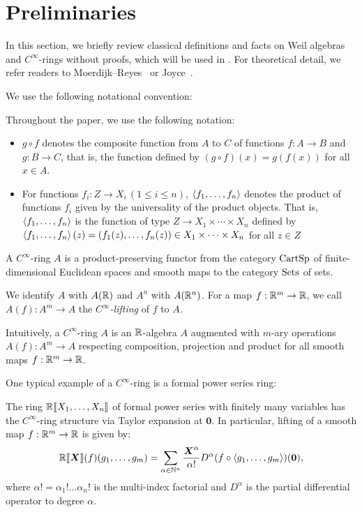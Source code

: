 \section{Preliminaries}\label{sec:prel}
In this section, we briefly review classical definitions and facts on Weil algebras and $C^\infty$-rings without proofs, which will be used in .
For theoretical detail, we refer readers to Moerdijk--Reyes~\cite[Chapters I and II]{Moerdijk:1991aa} or Joyce~\cite{joyce2016algebraic}.

We use the following notational convention:
\begin{definition}[Notation]
  Throughout the paper, we use the following notation:
  \begin{itemize}
    \item
    $g \circ f$ denotes the composite function from $A$ to $C$ of functions $f: A \to B$ and $g: B \to C$, that is, the function defined by $(g \circ f)(x) = g(f(x))$ for all $x \in A$.
    \item For functions $f_i: Z \to X_i\,(1 \leq i \leq n)$,
    $\braket{f_1, \dots, f_n}$ denotes the product of functions $f_i$ given by the universality of the product objects.
    That is, $\braket{f_1, \dots, f_n}$ is the function of type $Z \to X_1 \times \cdots \times X_n$ defined by $\braket{f_1, \dots, f_n}(z) = (f_1(z), \dots, f_n(z)) \in X_1 \times \cdots \times X_n$ for all $z \in Z$
  \end{itemize}
\end{definition}

\begin{definition}
  A \emph{$C^\infty$}-ring $A$ is a product-preserving functor from the category $\mathord{\mathrm{CartSp}}$ of finite-dimensional Euclidean spaces and smooth maps to the category $\mathord{\mathrm{Sets}}$ of sets.

  We identify $A$ with $A(\mathbb{R})$ and $A^n$ with $A(\mathbb{R}^n)$.
  For a map $f: \mathbb{R}^m \to \mathbb{R}$, we call $A(f): A^m \to A$ the \emph{$C^\infty$-lifting} of $f$ to $A$.
\end{definition}

Intuitively, a $C^\infty$-ring $A$ is an $\mathbb{R}$-algebra $A$ augmented with $m$-ary operations $A(f): A^m \to A$ respecting composition, projection and product for all smooth maps $f: \mathbb{R}^m \to \mathbb{R}$.

One typical example of a $C^\infty$-ring is a formal power series ring:

\begin{theorem}\label{thm:series-is-smooth}
  The ring $\mathbb{R}\llbracket X_1, \dots, X_n\rrbracket$ of formal power series with finitely many variables has the $C^\infty$-ring structure via Taylor expansion at $\boldsymbol{0}$.
  In particular, lifting of a smooth map $f: \mathbb{R}^m \to \mathbb{R}$ is given by:
  \[
    \mathord{\mathbb{R}\llbracket\boldsymbol{X}\rrbracket}(f)(g_1, \dots, g_m) = \sum_{\alpha \in \mathbb{N}^n} \frac{\boldsymbol{X}^\alpha}{\alpha!} D^\alpha(f \circ \braket{g_1, \dots, g_m})(\boldsymbol{0}),
  \]
  where $\alpha! = \alpha_1 ! \dots \alpha_n !$ is the multi-index factorial and $D^\alpha$ is the partial differential operator to degree $\alpha$.
\end{theorem}

